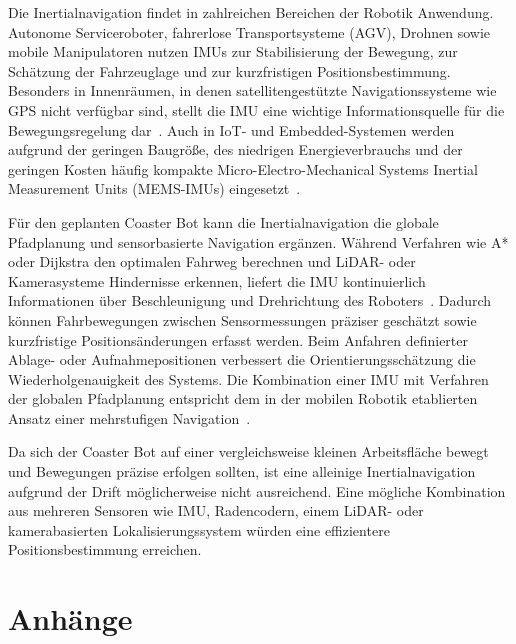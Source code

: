 \documentclass[
  a4paper,
  12pt,
  DIV=12,        %
  parskip=half,  %
  headings=small %
]{scrartcl}
\theoremstyle{definition}
\theoremstyle{definition}
\begin{document}
Die Inertialnavigation findet in zahlreichen Bereichen der Robotik Anwendung.
Autonome Serviceroboter, fahrerlose Transportsysteme (AGV), Drohnen sowie
mobile Manipulatoren nutzen IMUs zur Stabilisierung der Bewegung, zur Schätzung
der Fahrzeuglage und zur kurzfristigen Positionsbestimmung. Besonders in
Innenräumen, in denen satellitengestützte Navigationssysteme wie GPS nicht
verfügbar sind, stellt die IMU eine wichtige Informationsquelle für die
Bewegungsregelung dar~\cite{GPS}. Auch in IoT- und Embedded-Systemen werden aufgrund der
geringen Baugröße, des niedrigen Energieverbrauchs und der geringen Kosten
häufig kompakte Micro-Electro-Mechanical Systems Inertial Measurement Units
(MEMS-IMUs) eingesetzt~\cite{ModernRobotics,HoB}.

Für den geplanten Coaster Bot kann die Inertialnavigation die globale
Pfadplanung und sensorbasierte Navigation ergänzen. Während Verfahren wie A*
oder Dijkstra den optimalen Fahrweg berechnen und LiDAR- oder
Kamerasysteme Hindernisse erkennen, liefert die IMU kontinuierlich
Informationen über Beschleunigung und Drehrichtung des
Roboters~\cite{AStar,IntroToAlgs}. Dadurch können
Fahrbewegungen zwischen Sensormessungen präziser geschätzt sowie kurzfristige
Positionsänderungen erfasst werden. Beim Anfahren definierter Ablage- oder
Aufnahmepositionen verbessert die Orientierungsschätzung die
Wiederholgenauigkeit des Systems. Die Kombination einer IMU mit Verfahren der
globalen Pfadplanung entspricht dem in der mobilen Robotik etablierten Ansatz
einer mehrstufigen Navigation~\cite{ModernRobotics,HoB}.

Da sich der Coaster Bot auf einer vergleichsweise kleinen Arbeitsfläche bewegt
und Bewegungen präzise erfolgen sollten,
ist eine alleinige Inertialnavigation aufgrund der Drift möglicherweise nicht
ausreichend. Eine mögliche Kombination aus mehreren Sensoren wie IMU,
Radencodern, einem LiDAR- oder kamerabasierten Lokalisierungssystem würden eine
effizientere Positionsbestimmung erreichen.


\newpage
\section{Anhänge}

\appendix

%
%

\printbibliography[title={Literaturverzeichnis}]

\listoffigures
\end{document}
